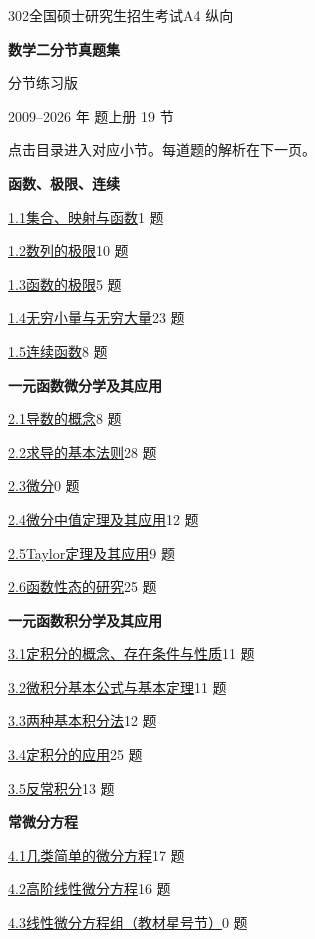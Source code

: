 \documentclass[UTF8,zihao=-4,fontset=fandol]{ctexart}
\newcommand{\BankFormat}{A4 纵向}
\newcommand{\BankSubtitle}{分节练习版}
\newcommand{\BankFormat}{4:3 横屏}
\newcommand{\BankSubtitle}{iPad 手写练习版}
\begin{document}
\hypertarget{contents}{}
{\small\textcolor{accent}{302\quad 全国硕士研究生招生考试\hfill \BankFormat}}\par\bigskip
{\huge\bfseries 数学二分节真题集}\par\smallskip
{\large \BankSubtitle}\par\smallskip
{\small 2009--2026 年 题\quad 上册 19 节}\par\smallskip
{\small 点击目录进入对应小节。每道题的解析在下一页。}\par\bigskip

\begin{minipage}[t]{0.48\linewidth}
\medskip\textbf{函数、极限、连续}\par
{\small\hyperlink{sec-1.1}{1.1\quad 集合、映射与函数}\hfill 1 题}\par
{\small\hyperlink{sec-1.2}{1.2\quad 数列的极限}\hfill 10 题}\par
{\small\hyperlink{sec-1.3}{1.3\quad 函数的极限}\hfill 5 题}\par
{\small\hyperlink{sec-1.4}{1.4\quad 无穷小量与无穷大量}\hfill 23 题}\par
{\small\hyperlink{sec-1.5}{1.5\quad 连续函数}\hfill 8 题}\par
\medskip\textbf{一元函数微分学及其应用}\par
{\small\hyperlink{sec-2.1}{2.1\quad 导数的概念}\hfill 8 题}\par
{\small\hyperlink{sec-2.2}{2.2\quad 求导的基本法则}\hfill 28 题}\par
{\small\hyperlink{sec-2.3}{2.3\quad 微分}\hfill 0 题}\par
{\small\hyperlink{sec-2.4}{2.4\quad 微分中值定理及其应用}\hfill 12 题}\par
{\small\hyperlink{sec-2.5}{2.5\quad Taylor定理及其应用}\hfill 9 题}\par
{\small\hyperlink{sec-2.6}{2.6\quad 函数性态的研究}\hfill 25 题}\par
\end{minipage}%
\hfill
\begin{minipage}[t]{0.48\linewidth}
\medskip\textbf{一元函数积分学及其应用}\par
{\small\hyperlink{sec-3.1}{3.1\quad 定积分的概念、存在条件与性质}\hfill 11 题}\par
{\small\hyperlink{sec-3.2}{3.2\quad 微积分基本公式与基本定理}\hfill 11 题}\par
{\small\hyperlink{sec-3.3}{3.3\quad 两种基本积分法}\hfill 12 题}\par
{\small\hyperlink{sec-3.4}{3.4\quad 定积分的应用}\hfill 25 题}\par
{\small\hyperlink{sec-3.5}{3.5\quad 反常积分}\hfill 13 题}\par
\medskip\textbf{常微分方程}\par
{\small\hyperlink{sec-4.1}{4.1\quad 几类简单的微分方程}\hfill 17 题}\par
{\small\hyperlink{sec-4.2}{4.2\quad 高阶线性微分方程}\hfill 16 题}\par
{\small\hyperlink{sec-4.3}{4.3\quad 线性微分方程组（教材星号节）}\hfill 0 题}\par
\end{minipage}%
\end{document}
